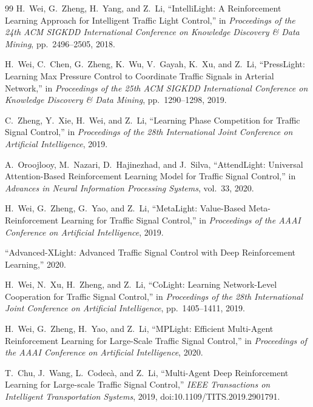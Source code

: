 \documentclass[3p,times]{elsarticle}
\theoremstyle{plain}
\theoremstyle{definition}
\begin{document}
\begin{thebibliography}{99}
H.~Wei, G.~Zheng, H.~Yang, and Z.~Li,
``IntelliLight: A Reinforcement Learning Approach for Intelligent
Traffic Light Control,''
in \textit{Proceedings of the 24th ACM SIGKDD International
Conference on Knowledge Discovery \& Data Mining},
pp.~2496--2505, 2018.

H.~Wei, C.~Chen, G.~Zheng, K.~Wu, V.~Gayah, K.~Xu, and Z.~Li,
``PressLight: Learning Max Pressure Control to Coordinate Traffic
Signals in Arterial Network,''
in \textit{Proceedings of the 25th ACM SIGKDD International
Conference on Knowledge Discovery \& Data Mining},
pp.~1290--1298, 2019.

C.~Zheng, Y.~Xie, H.~Wei, and Z.~Li,
``Learning Phase Competition for Traffic Signal Control,''
in \textit{Proceedings of the 28th International Joint Conference on
Artificial Intelligence}, 2019.

A.~Oroojlooy, M.~Nazari, D.~Hajinezhad, and J.~Silva,
``AttendLight: Universal Attention-Based Reinforcement Learning
Model for Traffic Signal Control,''
in \textit{Advances in Neural Information Processing Systems},
vol.~33, 2020.

H.~Wei, G.~Zheng, G.~Yao, and Z.~Li,
``MetaLight: Value-Based Meta-Reinforcement Learning for Traffic
Signal Control,''
in \textit{Proceedings of the AAAI Conference on Artificial
Intelligence}, 2019.

``Advanced-XLight: Advanced Traffic Signal Control with Deep
Reinforcement Learning,''
2020.


H.~Wei, N.~Xu, H.~Zheng, and Z.~Li,
``CoLight: Learning Network-Level Cooperation for Traffic Signal
Control,''
in \textit{Proceedings of the 28th International Joint Conference on
Artificial Intelligence},
pp.~1405--1411, 2019.

H.~Wei, G.~Zheng, H.~Yao, and Z.~Li,
``MPLight: Efficient Multi-Agent Reinforcement Learning for
Large-Scale Traffic Signal Control,''
in \textit{Proceedings of the AAAI Conference on Artificial
Intelligence}, 2020.

T.~Chu, J.~Wang, L.~Codec\`a, and Z.~Li,
``Multi-Agent Deep Reinforcement Learning for Large-scale Traffic
Signal Control,''
\textit{IEEE Transactions on Intelligent Transportation Systems},
2019,
doi:10.1109/TITS.2019.2901791.


\end{thebibliography}
\end{document}
